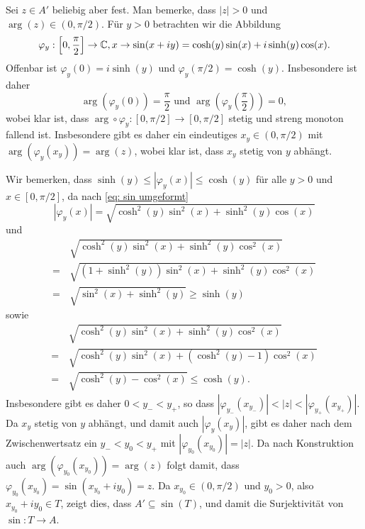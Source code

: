 \documentclass[a4paper,10pt]{article}
\begin{document}
Sei $z \in A'$ beliebig aber fest. Man bemerke, dass $|z| > 0$ und $\arg(z) \in (0,\pi/2)$. Für $y > 0$ betrachten wir die Abbildung
\[
 \varphi_y : \left[0,\frac{\pi}{2}\right] \to \mathbb{C}, x \to \sin(x+iy) = \cosh(y)\sin(x)+i\sinh(y)\cos(x).
\]
Offenbar ist $\varphi_y(0) = i\sinh(y)$ und $\varphi_y(\pi/2) = \cosh(y)$. Insbesondere ist daher
\[
 \arg(\varphi_y(0)) = \frac{\pi}{2} \text{ und } \arg\left(\varphi_y\left(\frac{\pi}{2}\right)\right) = 0,
\]
wobei klar ist, dass $\arg \circ \varphi_y : [0,\pi/2] \to [0,\pi/2]$ stetig und streng monoton fallend ist. Insbesondere gibt es daher ein eindeutiges $x_y \in (0,\pi/2)$ mit $\arg(\varphi_y(x_y)) = \arg(z)$, wobei klar ist, dass $x_y$ stetig von $y$ abhängt.

Wir bemerken, dass $\sinh(y) \leq |\varphi_y(x)| \leq \cosh(y)$ für alle $y > 0$ und $x \in [0,\pi/2]$, da nach \eqref{eq: sin umgeformt}
\[
 |\varphi_y(x)| = \sqrt{\cosh^2(y)\sin^2(x)+\sinh^2(y)\cos(x)}
\]
und
\begin{align*}
  &\,\sqrt{\cosh^2(y)\sin^2(x)+\sinh^2(y)\cos^2(x)} \\
 =&\, \sqrt{(1+\sinh^2(y))\sin^2(x)+\sinh^2(y)\cos^2(x)} \\
 =&\, \sqrt{\sin^2(x)+\sinh^2(y)}
 \geq \sinh(y)
\end{align*}
sowie
\begin{align*}
  &\,\sqrt{\cosh^2(y)\sin^2(x)+\sinh^2(y)\cos^2(x)} \\
 =&\, \sqrt{\cosh^2(y)\sin^2(x)+(\cosh^2(y)-1)\cos^2(x)} \\
 =&\, \sqrt{\cosh^2(y)-\cos^2(x)}
 \leq \cosh(y).
\end{align*}
Insbesondere gibt es daher $0 < y_- < y_+$, so dass
$
 |\varphi_{y_-}\left(x_{y_-}\right)| < |z| <  |\varphi_{y_+}\left(x_{y_+}\right)|.
$
Da $x_y$ stetig von $y$ abhängt, und damit auch $|\varphi_y(x_y)|$, gibt es daher nach dem Zwischenwertsatz ein $y_- < y_0 < y_+$ mit $|\varphi_{y_0}\left(x_{y_0}\right)| = |z|$. Da nach Konstruktion auch $\arg\left(\varphi_{y_0}\left(x_{y_0}\right)\right) = \arg(z)$ folgt damit, dass
$
 \varphi_{y_0}\left(x_{y_0}\right) = \sin(x_{y_0}+iy_0) = z.
$
Da $x_{y_0} \in (0,\pi/2)$ und $y_0 > 0$, also $x_{y_0}+iy_0 \in T$, zeigt dies, dass $A' \subseteq \sin(T)$, und damit die Surjektivität von $\sin : T \to A$.
\end{document}
